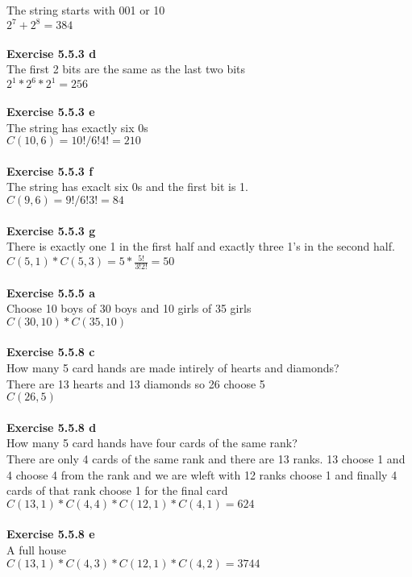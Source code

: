\documentclass{article}
\begin{document}
The string starts with 001 or 10\\
$2^7 + 2^8 = 384$\\\\
\textbf{Exercise 5.5.3 d}\\
The first 2 bits are the same as the last two bits\\
$2^1 * 2^6 * 2^1 = 256$\\\\
\textbf{Exercise 5.5.3 e}\\
The string has exactly six 0s\\
$C(10,6) = 10! / 6!4! = 210$\\\\
\textbf{Exercise 5.5.3 f}\\
The string has exaclt six 0s and the first bit is 1.\\
$C(9,6) = 9!/6!3! = 84$\\\\
\textbf{Exercise 5.5.3 g}\\
There is exactly one 1 in the first half and exactly three 1's in the second half.\\
$C(5,1) * C(5,3) = 5 * \frac{5!}{3!2!} = 50$\\\\
\textbf{Exercise 5.5.5 a}\\
Choose 10 boys of 30 boys and 10 girls of 35 girls\\
$C(30,10) * C(35,10)$\\\\
\textbf{Exercise 5.5.8 c}\\
How many 5 card hands are made intirely of hearts and diamonds?\\
There are 13 hearts and 13 diamonds so 26 choose 5\\
$C(26,5)$\\\\
\textbf{Exercise 5.5.8 d}\\
How many 5 card hands have four cards of the same rank?\\
There are only 4 cards of the same rank and there are 13 ranks. 13 choose 1 and 4 choose 4 from the rank and we are wleft with 12 ranks choose 1 and finally 4 cards of that rank choose 1 for the final card\\
$C(13,1) * C(4,4) * C(12,1) * C(4,1) = 624$\\\\
\textbf{Exercise 5.5.8 e}\\
A full house\\
$C(13,1) * C(4,3) * C(12,1)*C(4,2) = 3744$\\\\
\end{document}
